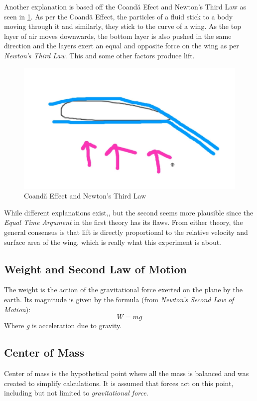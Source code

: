 \documentclass[12pt]{article}
\begin{document}
Another explanation is based off the Coandă Efect and Newton's Third Law as seen in \ref{fig:Coandă Effect}. As per the Coandă Effect, the particles of a fluid stick to a body moving through it and similarly, they stick to the curve of a wing. As the top layer of air moves downwards, the bottom layer is also pushed in the same direction and the layers exert an equal and opposite force on the wing as per \emph{Newton's Third Law}. This and some other factors produce lift.
\newpage
\begin{figure}[h]
	\begin{center}
		\includegraphics[scale=0.4]{wing}
	\end{center}
	\caption{Coandă Effect and Newton's Third Law}
	\label{fig:Coandă Effect}
\end{figure}
While different explanations exist,, but the second seems more plausible since the \emph{Equal Time Argument} in the first theory has its flaws. From either theory, the general consensus is that lift is directly proportional to the relative velocity and surface area of the wing, which is really what this experiment is about.
\subsection{Weight and Second Law of Motion}
The weight is the action of the gravitational force exerted on the plane by the earth. Its magnitude is given by the formula (from \emph{Newton's Second Law of Motion}):
\begin{equation}\label{eq:weight}
	W = mg
\end{equation}
Where \emph{g} is acceleration due to gravity.
\subsection{Center of Mass}
Center of mass is the hypothetical point where all the mass is balanced and was created to simplify calculations. It is assumed that forces act on this point, including but not limited to \emph{gravitational force}.
\end{document}
